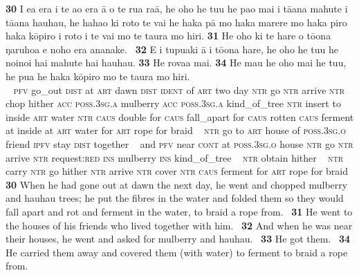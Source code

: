 {\newpage 
\gll
\textbf{\textup{30}} I e{\ꞌ}a era {\ꞌ}i te {\ꞌ}ao era {\ꞌ}ā o te rua ra{\ꞌ}ā, he oho he tu{\ꞌ}u he pa{\ꞌ}o mai i tā{\ꞌ}ana mahute i tā{\ꞌ}ana hauhau, he haha{\ꞌ}o ki roto te vai he haka pā mo haka marere mo haka piro haka kōpiro {\ꞌ}i roto i te vai mo te taura mo hiri. \textbf{\textup{31}} He oho ki te hare o tō{\ꞌ}ona ŋaruhoa e noho era ananake. ~\textbf{\textup{32}} {\ꞌ}E i tupu{\ꞌ}aki {\ꞌ}ā {\ꞌ}i tō{\ꞌ}ona hare, he oho he tu{\ꞌ}u he no{\ꞌ}ino{\ꞌ}i hai mahute hai hauhau. \textbf{\textup{33}} He rova{\ꞌ}a mai. \textbf{34} He ma{\ꞌ}u he oho mai he tu{\ꞌ}u, he pu{\ꞌ}a he haka kōpiro mo te taura mo hiri.\\
~ \textsc{pfv} go\_out \textsc{dist} at \textsc{art} dawn \textsc{dist} \textsc{ident} of \textsc{art} two day \textsc{ntr} go \textsc{ntr} arrive \textsc{ntr} chop hither \textsc{acc} \textsc{poss.3sg.a} mulberry \textsc{acc} \textsc{poss.3sg.a} kind\_of\_tree \textsc{ntr} insert to inside \textsc{art} water \textsc{ntr} \textsc{caus} double for \textsc{caus} fall\_apart for \textsc{caus} rotten \textsc{caus} ferment at inside at \textsc{art} water for \textsc{art} rope for braid ~ \textsc{ntr} go to \textsc{art} house of \textsc{poss.3sg.o} friend \textsc{ipfv} stay \textsc{dist} together ~ and \textsc{pfv} near \textsc{cont} at \textsc{poss.3sg.o} house \textsc{ntr} go \textsc{ntr} arrive \textsc{ntr} request:\textsc{red} \textsc{ins} mulberry \textsc{ins} kind\_of\_tree ~ \textsc{ntr} obtain hither ~ \textsc{ntr} carry \textsc{ntr} go hither \textsc{ntr} arrive \textsc{ntr} cover \textsc{ntr} \textsc{caus} ferment for \textsc{art} rope for braid\\

\medskip\glt
\textbf{\textup{30}} When he had gone out at dawn the next day, he went and chopped mulberry and hauhau trees; he put the fibres in the water and folded them so they would fall apart and rot and ferment in the water, to braid a rope from. ~\textbf{\textup{31}} He went to the houses of his friends who lived together with him. ~\textbf{\textup{32}} And when he was near their houses, he went and asked for mulberry and hauhau. ~\textbf{\textup{33}} He got them. ~\textbf{\textup{34}} He carried them away and covered them (with water) to ferment to braid a rope from.


~

}
